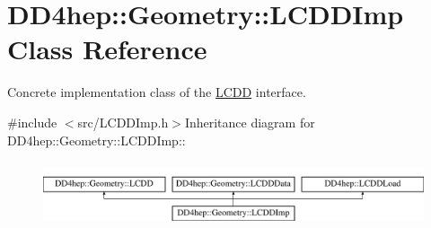 \hypertarget{class_d_d4hep_1_1_geometry_1_1_l_c_d_d_imp}{
\section{DD4hep::Geometry::LCDDImp Class Reference}
\label{class_d_d4hep_1_1_geometry_1_1_l_c_d_d_imp}
}


Concrete implementation class of the \hyperlink{class_d_d4hep_1_1_geometry_1_1_l_c_d_d}{LCDD} interface.  


{\ttfamily \#include $<$src/LCDDImp.h$>$}Inheritance diagram for DD4hep::Geometry::LCDDImp::\begin{figure}[H]
\begin{center}
\leavevmode
\includegraphics[height=1.94444cm]{class_d_d4hep_1_1_geometry_1_1_l_c_d_d_imp}
\end{center}
\end{figure}
